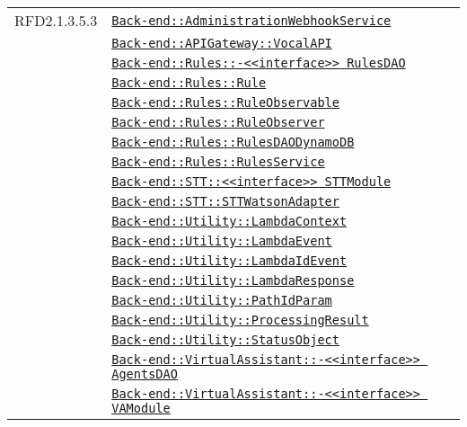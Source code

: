 \begin{longtable}{|>{\centering}m{3cm}|m{10cm}<{\centering}|}
RFD2.1.3.5.3 & \hyperref[Back-end::AdministrationWebhookService]{\texttt{Back-end::AdministrationWebhookService}}\\
& \hyperref[Back-end::APIGateway::VocalAPI]{\texttt{Back-end::APIGateway::VocalAPI}}\\
& \hyperref[Back-end::Rules::<<interface>> RulesDAO]{\texttt{Back-end::Rules::-\linebreak <<interface>> RulesDAO}}\\
& \hyperref[Back-end::Rules::Rule]{\texttt{Back-end::Rules::Rule}}\\
& \hyperref[Back-end::Rules::RuleObservable]{\texttt{Back-end::Rules::RuleObservable}}\\
& \hyperref[Back-end::Rules::RuleObserver]{\texttt{Back-end::Rules::RuleObserver}}\\
& \hyperref[Back-end::Rules::RulesDAODynamoDB]{\texttt{Back-end::Rules::RulesDAODynamoDB}}\\
& \hyperref[Back-end::Rules::RulesService]{\texttt{Back-end::Rules::RulesService}}\\
& \hyperref[Back-end::STT::<<interface>> STTModule]{\texttt{Back-end::STT::<<interface>> STTModule}}\\
& \hyperref[Back-end::STT::STTWatsonAdapter]{\texttt{Back-end::STT::STTWatsonAdapter}}\\
& \hyperref[Back-end::Utility::LambdaContext]{\texttt{Back-end::Utility::LambdaContext}}\\
& \hyperref[Back-end::Utility::LambdaEvent]{\texttt{Back-end::Utility::LambdaEvent}}\\
& \hyperref[Back-end::Utility::LambdaIdEvent]{\texttt{Back-end::Utility::LambdaIdEvent}}\\
& \hyperref[Back-end::Utility::LambdaResponse]{\texttt{Back-end::Utility::LambdaResponse}}\\
& \hyperref[Back-end::Utility::PathIdParam]{\texttt{Back-end::Utility::PathIdParam}}\\
& \hyperref[Back-end::Utility::ProcessingResult]{\texttt{Back-end::Utility::ProcessingResult}}\\
& \hyperref[Back-end::Utility::StatusObject]{\texttt{Back-end::Utility::StatusObject}}\\
& \hyperref[Back-end::VirtualAssistant::<<interface>> AgentsDAO]{\texttt{Back-end::VirtualAssistant::-\linebreak <<interface>> AgentsDAO}}\\
& \hyperref[Back-end::VirtualAssistant::<<interface>> VAModule]{\texttt{Back-end::VirtualAssistant::-\linebreak <<interface>> VAModule}}\\

\end{longtable}
